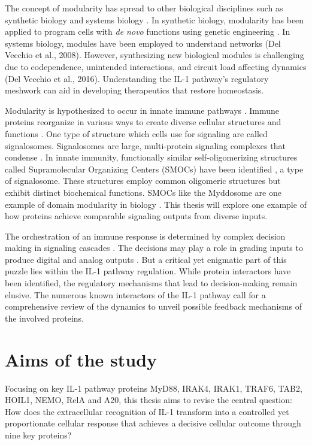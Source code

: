 The concept of modularity has spread to other biological disciplines such as synthetic biology \autocite{DelVecchio_2015} and systems biology \autocite{Wagner_2007}. In synthetic biology, modularity has been applied to program cells with \emph{de novo} functions using genetic engineering \autocite{Bashor_2010}\autocite{Lim_2022}. In systems biology, modules have been employed to understand networks (Del Vecchio et al., 2008). However, synthesizing new biological modules is challenging due to codependence, unintended interactions, and circuit load affecting dynamics (Del Vecchio et al., 2016). Understanding the IL-1 pathway's regulatory meshwork can aid in developing therapeutics that restore homeostasis.
 
Modularity is hypothesized to occur in innate immune pathways \autocite{Tan_2019}. Immune proteins reorganize in various ways to create diverse cellular structures and functions \autocite{Tonegawa_1983}\autocite{Chaplin_2010}. One type of structure which cells use for signaling are called signalosomes. Signalosomes are large, multi-protein signaling complexes that condense \autocite{Bray_1995}. In innate immunity, functionally similar self-oligomerizing structures called Supramolecular Organizing Centers (SMOCs) have been identified \autocite{Kagan_2014}, a type of signalosome. These structures employ common oligomeric structures but exhibit distinct biochemical functions. SMOCs like the Myddosome are one example of domain modularity in biology \autocite{Kagan_2014}\autocite{Tan_2019}. This thesis will explore one example of how proteins achieve comparable signaling outputs from diverse inputs.

The orchestration of an immune response is determined by complex decision making in signaling cascades \autocite{DeFelice_2019}. The decisions may play a role in grading inputs to produce digital and analog outputs \autocite{Cao_2023}. But a critical yet enigmatic part of this puzzle lies within the IL-1 pathway regulation. While protein interactors have been identified, the regulatory mechanisms that lead to decision-making remain elusive. The numerous known interactors of the IL-1 pathway call for a comprehensive review of the dynamics to unveil possible feedback mechanisms of the involved proteins.

\chapter{Aims of the study}
\label{chapter:aims}
\sectionmark{}
Focusing on key IL-1 pathway proteins MyD88, IRAK4, IRAK1, TRAF6, TAB2, HOIL1, NEMO, RelA and A20, this thesis aims to revise the central question: How does the extracellular recognition of IL-1 transform into a controlled yet proportionate cellular response that achieves a decisive cellular outcome through nine key proteins?

